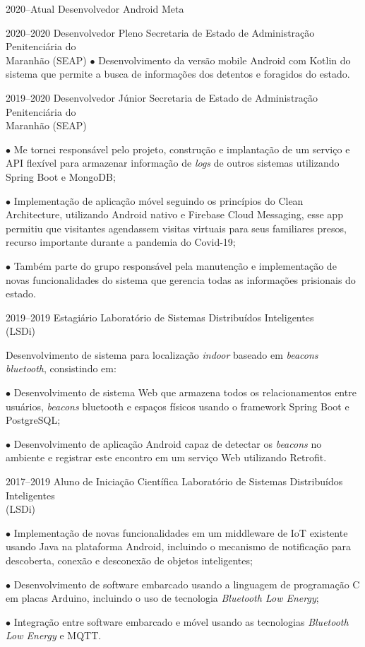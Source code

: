 \documentclass[]{../document-class/twentysecondcv}
\begin{document}
\begin{twenty}
	\twentyitem
		{2020--Atual}
		{Desenvolvedor Android}
		{Meta}
		{}

	\twentyitem
		{2020--2020}
		{Desenvolvedor Pleno}
		{Secretaria de Estado de Administração Penitenciária do \\\hspace*{\fill}Maranhão (SEAP)}
		{
			$\bullet$ Desenvolvimento da versão mobile Android com Kotlin do sistema que permite a busca de informações dos detentos e foragidos do estado.
		}

	\twentyitem
		{2019--2020}
		{Desenvolvedor Júnior}
		{Secretaria de Estado de Administração Penitenciária do \\\hspace*{\fill}Maranhão (SEAP)}
		{
			$\bullet$ Me tornei responsável pelo projeto, construção e implantação de um serviço e API flexível para armazenar informação de \textit{logs} de outros sistemas utilizando Spring Boot e MongoDB;\vskip 4pt 

			$\bullet$  Implementação de aplicação móvel seguindo os princípios do Clean Architecture, utilizando Android nativo e Firebase Cloud Messaging, esse app permitiu que visitantes agendassem visitas virtuais para seus familiares presos, recurso importante durante a pandemia do Covid-19;\vskip 4pt

			$\bullet$ Também parte do grupo responsável pela manutenção e implementação de novas funcionalidades do sistema que gerencia todas as informações prisionais do estado.
		}
	
	\twentyitem
		{2019--2019}
		{Estagiário}
		{Laboratório de Sistemas Distribuídos Inteligentes \\\hspace*{\fill}(LSDi)}
		{
			Desenvolvimento de sistema para localização \textit{indoor} baseado em \textit{beacons bluetooth}, consistindo em:\vskip 4pt
          
			$\bullet$ Desenvolvimento de sistema Web que armazena todos os relacionamentos entre usuários, \textit{beacons} bluetooth e espaços físicos usando o framework Spring Boot e PostgreSQL;\vskip 4pt
        
			$\bullet$ Desenvolvimento de aplicação Android capaz de detectar os \textit{beacons} no ambiente e registrar este encontro em um serviço Web utilizando Retrofit.
		}
			
	\twentyitem
		{2017--2019}
		{Aluno de Iniciação Científica}
		{Laboratório de Sistemas Distribuídos Inteligentes \\\hspace*{\fill}(LSDi)}
		{
			$\bullet$ Implementação de novas funcionalidades em um middleware de IoT existente usando Java na plataforma Android, incluindo o mecanismo de notificação para descoberta, conexão e desconexão de objetos inteligentes;\vskip 4pt

			$\bullet$ Desenvolvimento de software embarcado usando a linguagem de programação C em placas Arduino, incluindo o uso de tecnologia \textit{Bluetooth Low Energy};\vskip 4pt

			$\bullet$ Integração entre software embarcado e móvel usando as tecnologias \textit{Bluetooth Low Energy} e MQTT.
		}
\end{twenty}
\end{document}
